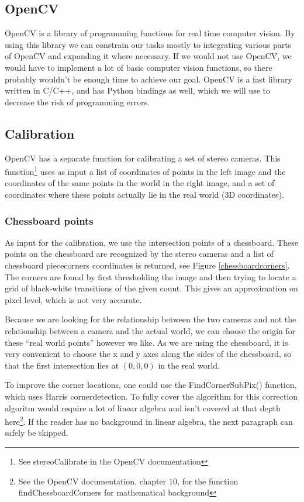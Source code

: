 \documentclass[a4paper]{article}
\begin{document}
\subsection{OpenCV}
\label{opencv} OpenCV is a library of programming functions for real
time computer vision. By using this library we can constrain our tasks
mostly to integrating various parts of OpenCV and expanding it where
necessary. If we would not use OpenCV, we would have to implement a lot
of basic computer vision functions, so there probably wouldn't be
enough time to achieve our goal. OpenCV is a fast library written in C/C++,
and has Python bindings as well, which we will use to decrease the risk
of programming errors.

\subsection{Calibration}
\label{calib_implement} OpenCV has a separate function for calibrating
a set of stereo cameras. This function\footnote{See stereoCalibrate in
the OpenCV documentation} uses as input a list of coordinates of
points in the left image and the coordinates of the same points in the
world in the right image, and a set of coordinates where these points
actually lie in the real world (3D coordinates).

\subsubsection{Chessboard points}
\label{chessboardpoints} As input for the calibration, we use
the intersection points of a chessboard. These points on the
chessboard are recognized by the stereo cameras and a list of
chessboard piececorners coordinates is returned, see Figure
\ref{chessboardcorners}. The corners are found by first
thresholding the image and then trying to locate a grid of black-white
transitions of the given count. This gives an approximation on pixel level,
which is not very accurate.

Because we are looking for the relationship between the two cameras and
not the relationship between a camera and the actual world, we can
choose the origin for these ``real world points'' however we like. As
we are using the chessboard, it is very convenient to choose the x and
y axes along the sides of the chessboard, so that the first
intersection lies at $(0, 0, 0)$ in the real world.

To improve the corner locations, one could use the FindCornerSubPix()
function, which uses Harris cornerdetection. To fully cover the
algorithm for this correction algoritm would require a lot of linear
algebra and isn't covered at that depth here\footnote{See the OpenCV
documentation, chapter 10, for the function findChessboardCorners for
mathematical background}. If the reader has no background in linear
algebra, the next paragraph can safely be skipped.
\end{document}
